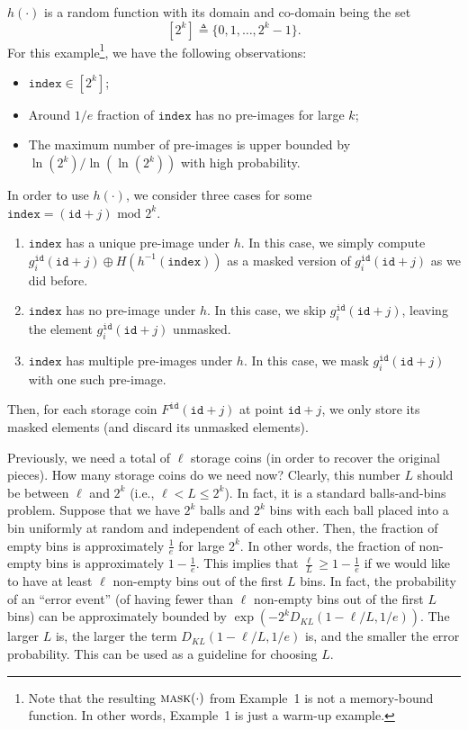 \documentclass[12pt,draftcls,onecolumn]{IEEEtran}
\newcommand{\id}{\texttt{id}}
\newcommand{\ind}{\texttt{index}}
\newcommand{\mask}{\textsc{mask}}
\begin{document}
 $h(\cdot)$ is a random function with its domain and co-domain being the set
\[
[2^k] \triangleq \{ 0, 1, \ldots, 2^k - 1  \}.
\]
For this example\footnote{Note that the resulting $\mask(\cdot)$ from Example~1 is not a memory-bound function. In other words, Example~1 is just a warm-up example.}, we have the following observations:
\begin{itemize}
    \item $\ind \in [2^k]$;
    \item Around $1/e$ fraction of $\ind$ has no pre-images for large $k$;
    \item The maximum number of pre-images is upper bounded by $\ln(2^k)/\ln\left( \ln(2^k) \right)$ with high probability.
\end{itemize}

In order to use $h(\cdot)$, we consider three cases for some $\ind = (\id + j) \mbox{ mod } 2^k$.
\begin{enumerate}
    \item $\ind$ has a unique pre-image under $h$. In this case, we simply compute $g_i^{\id}(\id + j) \oplus H\left( h^{-1}(\ind) \right)$ as a masked version of $g_i^{\id}(\id + j)$ as we did before.
    \item $\ind$ has no pre-image under $h$. In this case, we skip $g_i^{\id}(\id + j)$, leaving the element $g_i^{\id}(\id + j)$ unmasked.
    \item $\ind$ has multiple pre-images under $h$. In this case, we mask $g_i^{\id}(\id + j)$ with one such pre-image.
\end{enumerate}
Then, for each storage coin $F^{\id}(\id + j)$ at point $\id + j$, we only store its masked elements (and discard its unmasked elements).

Previously, we need a total of $\ell$ storage coins (in order to recover the original pieces). How many storage coins do we need now?
Clearly, this number $L$ should be between $\ell$ and $2^k$ (i.e., $\ell < L \le 2^k$).
In fact, it is a standard balls-and-bins problem. 
Suppose that we have $2^k$ balls and $2^k$ bins with each ball placed into a bin uniformly at random and independent of each other.
Then, the fraction of empty bins is approximately $\frac{1}{e}$ for large $2^k$.
In other words, the fraction of non-empty bins is approximately $1 - \frac{1}{e}$.
This implies that $\frac{\ell}{L} \ge 1 - \frac{1}{e}$ if we would like to have at least $\ell$ non-empty bins out of the first $L$ bins. 
In fact, the probability of an ``error event'' (of having fewer than $\ell$ non-empty bins out of the first $L$ bins) can be approximately bounded by $\exp\left(- 2^k D_{KL}(1 - \ell/L, 1/e) \right)$. The larger $L$ is, the larger the term $D_{KL}(1 - \ell/L, 1/e)$ is, and the smaller the error probability.
This can be used as a guideline for choosing $L$.
\end{document}
